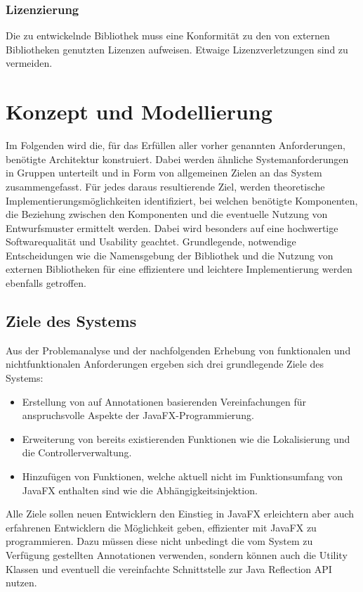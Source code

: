 \subsubsection{\nreq{} Lizenzierung}
Die zu entwickelnde Bibliothek muss eine Konformität zu den von externen Bibliotheken genutzten Lizenzen aufweisen. Etwaige Lizenzverletzungen sind zu vermeiden.

\section{Konzept und Modellierung}
\label{konzept_und_modellierung}
Im Folgenden wird die, für das Erfüllen aller vorher genannten Anforderungen, benötigte Architektur konstruiert. Dabei werden ähnliche Systemanforderungen in Gruppen unterteilt und in Form von allgemeinen Zielen an das System zusammengefasst. Für jedes daraus resultierende Ziel, werden theoretische Implementierungsmöglichkeiten identifiziert, bei welchen benötigte Komponenten, die Beziehung zwischen den Komponenten und die eventuelle Nutzung von Entwurfsmuster ermittelt werden. Dabei wird besonders auf eine hochwertige Softwarequalität und Usability geachtet. Grundlegende, notwendige Entscheidungen wie die Namensgebung der Bibliothek und die Nutzung von externen Bibliotheken für eine effizientere und leichtere Implementierung werden ebenfalls getroffen. 
\subsection{Ziele des Systems}
Aus der Problemanalyse und der nachfolgenden Erhebung von funktionalen und nichtfunktionalen Anforderungen ergeben sich drei grundlegende Ziele des Systems:
\begin{itemize}
	\item Erstellung von auf Annotationen basierenden Vereinfachungen für anspruchsvolle Aspekte der JavaFX-Programmierung.
	\item Erweiterung von bereits existierenden Funktionen wie die Lokalisierung und die Controllerverwaltung.
	\item Hinzufügen von Funktionen, welche aktuell nicht im Funktionsumfang von JavaFX enthalten sind wie die Abhängigkeitsinjektion.
\end{itemize}
Alle Ziele sollen neuen Entwicklern den Einstieg in JavaFX erleichtern aber auch erfahrenen Entwicklern die Möglichkeit geben, effizienter mit JavaFX zu programmieren. Dazu müssen diese nicht unbedingt die vom System zu Verfügung gestellten Annotationen verwenden, sondern können auch die Utility Klassen und eventuell die vereinfachte Schnittstelle zur Java Reflection API nutzen.
